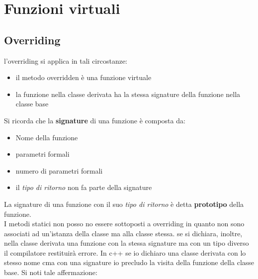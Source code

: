\documentclass{report}
\begin{document}
\section{Funzioni virtuali}


\subsection{Overriding}

l'overriding si applica in tali circostanze:
\begin{itemize}
    \item il metodo overridden è una funzione virtuale
    \item la funzione nella classe derivata ha la stessa signature della funzione nella classe base
\end{itemize}

Si ricorda che la \textbf{signature} di una funzione è composta da:
\begin{itemize}
    \item Nome della funzione
    \item parametri formali
    \item numero di parametri formali
    \item il \textit{tipo di ritorno} non fa parte della signature
\end{itemize}

La signature di una funzione con il suo \textit{tipo di ritorno} è detta \textbf{prototipo} della funzione. \\
I metodi statici non posso no essere sottoposti a overriding in quanto non sono associati ad un'istanza della classe ma alla classe stessa. se si dichiara, inoltre, nella classe derivata una funzione con la stessa signature ma con un tipo diverso il compilatore restituirà errore. In c++ se io dichiaro una classe derivata con lo stesso nome cma con una signature io precludo la visita della funzione della classe base. Si noti tale affermazione:

\end{document}
